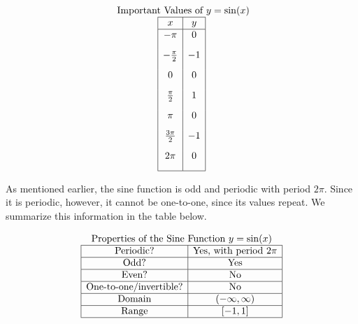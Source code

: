 \documentclass[nooutcomes]{ximera}
\begin{document}
\begin{center}
\end{center}

\[
\begin{array}{ c }
 \text{ Important Values of  $y=\sin(x)$}\\
\begin{array}{|c|c|}
 \hline
 x & y\\
 \hline
 -\pi&0\\[2ex]
 -\frac{\pi}{2}&-1\\[2ex]
 0&0\\[2ex]
 \frac{\pi}{2}&1\\[2ex]
 \pi&0\\[2ex]
\frac{3\pi}{2}&-1\\[2ex]
 2 \pi&0\\[2ex]
\hline
\end{array}
\end{array}
\]


As mentioned earlier, the sine function is odd and periodic with period $2\pi$. Since it is periodic, however, it cannot be one-to-one, since its values repeat. We summarize this information in the table below.

\[
\begin{array}{ c }
 \text{\normalfont Properties of the Sine Function } y=\sin(x) \\
\begin{array}{|c|c|}
 \hline
\text{Periodic?} & \text{Yes, with period }2\pi \\ \hline
\text{Odd?} & \text{Yes} \\ \hline
\text{Even?} & \text{No} \\ \hline
\text{One-to-one/invertible?} & \text{No} \\ \hline
\text{Domain} & (-\infty,\infty)\\ \hline
\text{Range} & [-1,1]\\ \hline
\end{array}
\end{array}
\]
\end{document}
